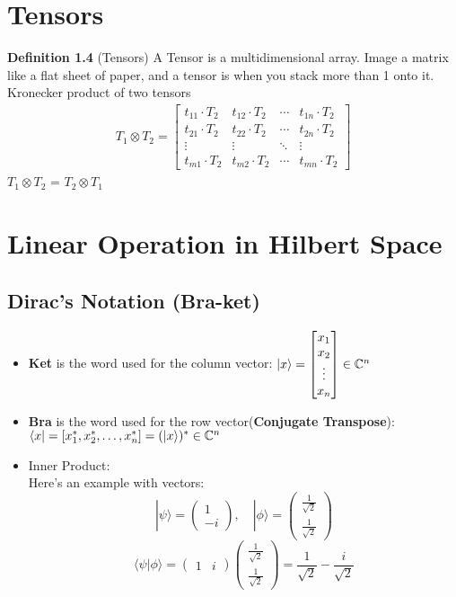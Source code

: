 \documentclass{report}
\begin{document}
\section{Tensors}
\textbf{Definition 1.4} (Tensors) A Tensor is a multidimensional array. Image a matrix like a flat sheet of paper, and a tensor is when you stack more than 1 onto it.\\

\noindent Kronecker product of two tensors
\begin{align}
    T_1 \otimes T_2 = \begin{bmatrix}
    t_{11} \cdot T_2 & t_{12} \cdot T_2 & \cdots & t_{1n} \cdot T_2 \\
    t_{21} \cdot T_2 & t_{22} \cdot T_2 & \cdots & t_{2n} \cdot T_2 \\
    \vdots & \vdots & \ddots & \vdots \\
    t_{m1} \cdot T_2 & t_{m2} \cdot T_2 & \cdots & t_{mn} \cdot T_2
\end{bmatrix}
\end{align}
$T_1 \otimes T_2$ = $T_2 \otimes T_1$
\section{Linear Operation in Hilbert Space}
\subsection{Dirac's Notation (Bra-ket)}
\begin{itemize}
    \item \textbf{Ket} is the word used for the column vector: $\ket{x} = \begin{bmatrix}
        x_{1} \\
        x_{2} \\
        \vdots \\
        x_{n}
    \end{bmatrix} \in \mathbb{C}^{n}$
    \item \textbf{Bra} is the word used for the row vector(\textbf{Conjugate Transpose}): $\bra{x} = [x_{1}^*, x_{2}^*, \dots, x_{n}^*] = (\ket{x})^* \in \mathbb{C}^n$
    \item Inner Product: \\
    Here's an example with vectors:
\[
|\psi\rangle = \begin{pmatrix} 1 \\ -i \end{pmatrix}, \quad |\phi\rangle = \begin{pmatrix} \frac{1}{\sqrt{2}} \\ \frac{1}{\sqrt{2}} \end{pmatrix}
\]
\[
\langle \psi | \phi \rangle = \begin{pmatrix} 1 & i \end{pmatrix} \begin{pmatrix} \frac{1}{\sqrt{2}} \\ \frac{1}{\sqrt{2}} \end{pmatrix} = \frac{1}{\sqrt{2}} - \frac{i}{\sqrt{2}}
\]
\end{itemize}
\end{document}
